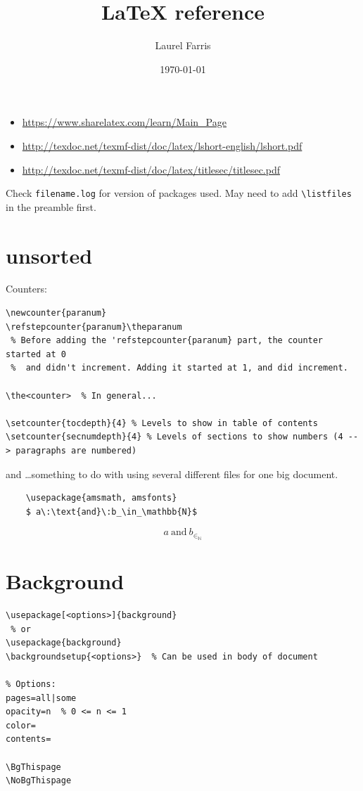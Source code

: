 \documentclass{article}
\title{LaTeX reference}
\author{Laurel Farris}
\date{\today}
\begin{document}
\maketitle
\begin{itemize}
    \item \url{https://www.sharelatex.com/learn/Main_Page}
    \item \url{http://texdoc.net/texmf-dist/doc/latex/lshort-english/lshort.pdf}
    \item \url{http://texdoc.net/texmf-dist/doc/latex/titlesec/titlesec.pdf}
\end{itemize}
\tableofcontents\newpage

Check \texttt{filename.log} for version of packages used. May need to add
\verb|\listfiles| in the preamble first.


\section{unsorted}

Counters:
\begin{lstlisting}
\newcounter{paranum}
\refstepcounter{paranum}\theparanum
 % Before adding the 'refstepcounter{paranum} part, the counter started at 0
 %  and didn't increment. Adding it started at 1, and did increment.

\the<counter>  % In general...

\setcounter{tocdepth}{4} % Levels to show in table of contents
\setcounter{secnumdepth}{4} % Levels of sections to show numbers (4 --> paragraphs are numbered)
\end{lstlisting}

\verb|| and \verb||\ldots something to do with using several
different files for one big document.

\begin{lstlisting}
    \usepackage{amsmath, amsfonts}
    $ a\:\text{and}\:b_\in_\mathbb{N}$

\end{lstlisting}
\[
    a\:\text{and}\:b_{\in_{\mathbb{N}}}
    \]

\section{Background}

\begin{lstlisting}
\usepackage[<options>]{background}
 % or
\usepackage{background}
\backgroundsetup{<options>}  % Can be used in body of document

% Options:
pages=all|some
opacity=n  % 0 <= n <= 1
color=
contents=

\BgThispage
\NoBgThispage
\end{lstlisting}
\end{document}
